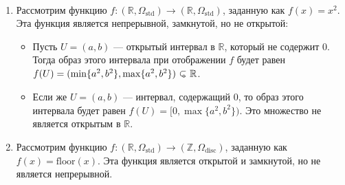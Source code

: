 \begin{example} \
	\begin{enumerate} 
		\item Рассмотрим функцию \( f: (\mathbb{R}, \Omega_{\text{std}}) \to (\mathbb{R}, \Omega_{\text{std}})\), заданную как \( f(x) = x^2 \). Эта функция является непрерывной, замкнутой, но не открытой:
		\begin{itemize}
			\item Пусть \( U = (a, b) \) — открытый интервал в \( \mathbb{R} \), который не содержит \( 0 \). Тогда образ этого интервала при отображении \( f \) будет равен \( f(U) = (\min\{a^2, b^2\}, \max\{a^2, b^2\}) \open \mathbb{R}\).
			\item Если же \( U = (a, b) \) — интервал, содержащий \( 0 \), то образ этого интервала будет равен \( f(U) = [0, \max\{a^2, b^2\}) \). Это множество не является открытым в \( \mathbb{R} \).
		\end{itemize}
		\item Рассмотрим функцию \( f: (\mathbb{R}, \Omega_{\text{std}}) \to (\mathbb{Z}, \Omega_{\text{disc}}) \), заданную как \( f(x) = \mathrm{floor}(x) \). Эта функция является открытой и замкнутой, но не является непрерывной. 
\end{enumerate}
\end{example}

